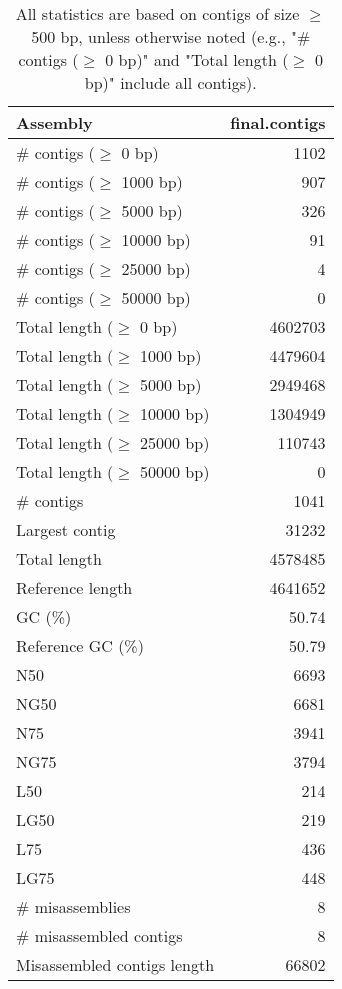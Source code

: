\documentclass[12pt,a4paper]{article}
\begin{document}
\begin{table}[ht]
\begin{center}
\caption{All statistics are based on contigs of size $\geq$ 500 bp, unless otherwise noted (e.g., "\# contigs ($\geq$ 0 bp)" and "Total length ($\geq$ 0 bp)" include all contigs).}
\begin{tabular}{|l*{1}{|r}|}
\hline
Assembly & final.contigs \\ \hline
\# contigs ($\geq$ 0 bp) & 1102 \\ \hline
\# contigs ($\geq$ 1000 bp) & 907 \\ \hline
\# contigs ($\geq$ 5000 bp) & 326 \\ \hline
\# contigs ($\geq$ 10000 bp) & 91 \\ \hline
\# contigs ($\geq$ 25000 bp) & 4 \\ \hline
\# contigs ($\geq$ 50000 bp) & 0 \\ \hline
Total length ($\geq$ 0 bp) & 4602703 \\ \hline
Total length ($\geq$ 1000 bp) & 4479604 \\ \hline
Total length ($\geq$ 5000 bp) & 2949468 \\ \hline
Total length ($\geq$ 10000 bp) & 1304949 \\ \hline
Total length ($\geq$ 25000 bp) & 110743 \\ \hline
Total length ($\geq$ 50000 bp) & 0 \\ \hline
\# contigs & 1041 \\ \hline
Largest contig & 31232 \\ \hline
Total length & 4578485 \\ \hline
Reference length & 4641652 \\ \hline
GC (\%) & 50.74 \\ \hline
Reference GC (\%) & 50.79 \\ \hline
N50 & 6693 \\ \hline
NG50 & 6681 \\ \hline
N75 & 3941 \\ \hline
NG75 & 3794 \\ \hline
L50 & 214 \\ \hline
LG50 & 219 \\ \hline
L75 & 436 \\ \hline
LG75 & 448 \\ \hline
\# misassemblies & 8 \\ \hline
\# misassembled contigs & 8 \\ \hline
Misassembled contigs length & 66802 \\ \hline

\end{tabular}
\end{center}
\end{table}
\end{document}
